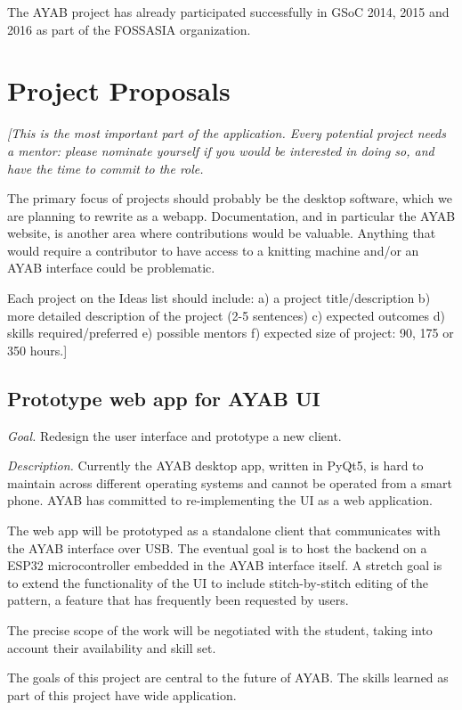 \documentclass{article}
\begin{document}
The AYAB project has already participated successfully in GSoC 2014, 2015 and 2016 as part of the FOSSASIA organization.

\section{Project Proposals}

{\itshape
[This is the most important part of the application. Every potential project needs a mentor: please nominate yourself if you would be interested in doing so, and have the time to commit to the role.

The primary focus of projects should probably be the desktop software, which we are planning to rewrite as a webapp. Documentation, and in particular the AYAB website, is another area where contributions would be valuable. Anything that would require a contributor to have access to a knitting machine and/or an AYAB interface could be problematic.

Each project on the Ideas list should include: a) a project title/description b) more detailed description of the project (2-5 sentences) c) expected outcomes d) skills required/preferred e) possible mentors f) expected size of project: 90, 175 or 350 hours.]
}

\subsection{Prototype web app for AYAB UI}

\textit{Goal.} Redesign the user interface and prototype a new client.

\textit{Description.} Currently the AYAB desktop app, written in PyQt5, is hard to maintain across different operating systems and cannot be operated from a smart phone. AYAB has committed to re-implementing the UI as a web application.

The web app will be prototyped as a standalone client that communicates with the AYAB interface over USB. The eventual goal is to host the backend on a ESP32 microcontroller embedded in the AYAB interface itself. A stretch goal is to extend the functionality of the UI to include stitch-by-stitch editing of the pattern, a feature that has frequently been requested by users.

The precise scope of the work will be negotiated with the student, taking into account their availability and skill set.

The goals of this project are central to the future of AYAB. The skills learned as part of this project have wide application.
\end{document}

